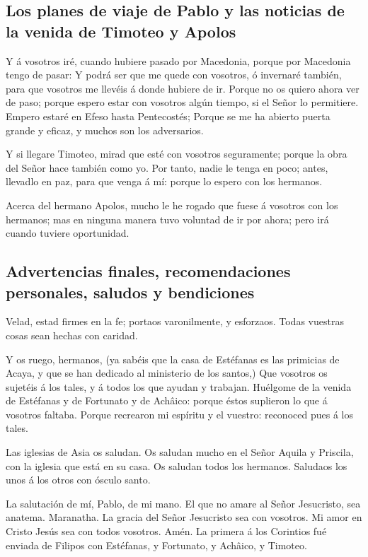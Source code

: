\hypertarget{los-planes-de-viaje-de-pablo-y-las-noticias-de-la-venida-de-timoteo-y-apolos}{%
\subsection{Los planes de viaje de Pablo y las noticias de la venida de
Timoteo y
Apolos}\label{los-planes-de-viaje-de-pablo-y-las-noticias-de-la-venida-de-timoteo-y-apolos}}

 Y á vosotros iré, cuando hubiere pasado por Macedonia,
porque por Macedonia tengo de pasar:  Y podrá ser que me
quede con vosotros, ó invernaré también, para que vosotros me llevéis á
donde hubiere de ir.  Porque no os quiero ahora ver de paso;
porque espero estar con vosotros algún tiempo, si el Señor lo
permitiere.  Empero estaré en Efeso hasta Pentecostés;
 Porque se me ha abierto puerta grande y eficaz, y muchos
son los adversarios.

 Y si llegare Timoteo, mirad que esté con vosotros
seguramente; porque la obra del Señor hace también como yo.
 Por tanto, nadie le tenga en poco; antes, llevadlo en paz,
para que venga á mí: porque lo espero con los hermanos.

 Acerca del hermano Apolos, mucho le he rogado que fuese á
vosotros con los hermanos; mas en ninguna manera tuvo voluntad de ir por
ahora; pero irá cuando tuviere oportunidad.

\hypertarget{advertencias-finales-recomendaciones-personales-saludos-y-bendiciones}{%
\subsection{Advertencias finales, recomendaciones personales, saludos y
bendiciones}\label{advertencias-finales-recomendaciones-personales-saludos-y-bendiciones}}

 Velad, estad firmes en la fe; portaos varonilmente, y
esforzaos.  Todas vuestras cosas sean hechas con caridad.

 Y os ruego, hermanos, (ya sabéis que la casa de Estéfanas
es las primicias de Acaya, y que se han dedicado al ministerio de los
santos,)  Que vosotros os sujetéis á los tales, y á todos
los que ayudan y trabajan.  Huélgome de la venida de
Estéfanas y de Fortunato y de Achâico: porque éstos suplieron lo que á
vosotros faltaba.  Porque recrearon mi espíritu y el
vuestro: reconoced pues á los tales.

 Las iglesias de Asia os saludan. Os saludan mucho en el
Señor Aquila y Priscila, con la iglesia que está en su casa.
 Os saludan todos los hermanos. Saludaos los unos á los
otros con ósculo santo.

 La salutación de mí, Pablo, de mi mano.  El
que no amare al Señor Jesucristo, sea anatema. Maranatha. 
La gracia del Señor Jesucristo sea con vosotros.  Mi amor
en Cristo Jesús sea con todos vosotros. Amén. La primera á los Corintios
fué enviada de Filipos con Estéfanas, y Fortunato, y Achâico, y Timoteo.
